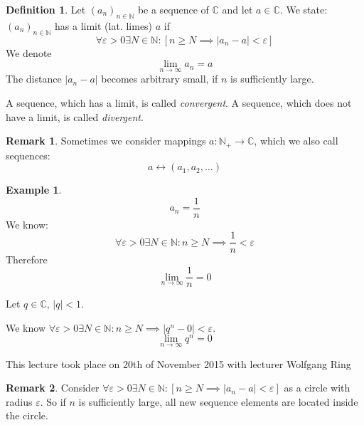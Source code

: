 \documentclass[a4paper,landscape,twocolumn]{article}
\theoremstyle{definition}
\newtheorem{defi}{Definition}
\newtheorem{rem}{Remark}
\newtheorem{ex}{Example}
\newcommand\abs[1]{\left|#1\right|}
\newcommand\seq[1]{{\left(#1\right)}_{n \in \mathbb N}}
\newcommand\meta[3]{\begin{mdframed}[skipbelow=4pt,skipabove=4pt,innermargin=1pt,innerleftmargin=1pt,innerrightmargin=1pt]\begin{center}\small{\textdownarrow{} This #1 took place on #2 with lecturer #3}\end{center}\end{mdframed}}
\begin{document}
\begin{defi}
  Let $\seq{a_n}$ be a sequence of $\mathbb C$ and let $a \in \mathbb C$.
  We state: $(a_n)_{n \in \mathbb N}$ has a limit (lat. limes) $a$ if
  \[ \forall \varepsilon > 0 \exists N \in \mathbb N: \left[n \geq N \implies \abs{a_n - a} < \varepsilon\right] \]
  We denote
  \[ \lim_{n \to \infty} a_n = a \]
  The distance $\abs{a_n - a}$ becomes arbitrary small, if $n$ is sufficiently large.

  A sequence, which has a limit, is called \emph{convergent}. A sequence, which does not have a limit, is called \emph{divergent}.
\end{defi}

\begin{rem}
  Sometimes we consider mappings $a: \mathbb N_+ \to \mathbb C$, which we also call sequences:
  \[ a \leftrightarrow (a_1, a_2, \ldots) \]
\end{rem}

\begin{ex}
  \[ a_n = \frac1n \]
  We know:
  \[ \forall \varepsilon > 0 \exists N \in \mathbb N: n \geq N \implies \frac1n < \varepsilon \]
  Therefore
  \[ \lim_{n \to \infty} \frac1n = 0 \]
\end{ex}

Let $q \in \mathbb C$, $\abs{q} < 1$.

We know $\forall \varepsilon > 0 \exists N \in \mathbb N: n \geq N \implies \abs{q^n - 0} < \varepsilon$.
\[ \lim_{n\to\infty} q^n = 0 \]

\meta{lecture}{20th of November 2015}{Wolfgang Ring}

\begin{rem}
  Consider $\forall \varepsilon > 0 \exists N \in \mathbb N: \left[n \geq N \implies \abs{a_n - a} < \varepsilon\right]$
  as a circle with radius $\varepsilon$. So if $n$ is sufficiently large,
  all new sequence elements are located inside the circle.
\end{rem}
\end{document}
